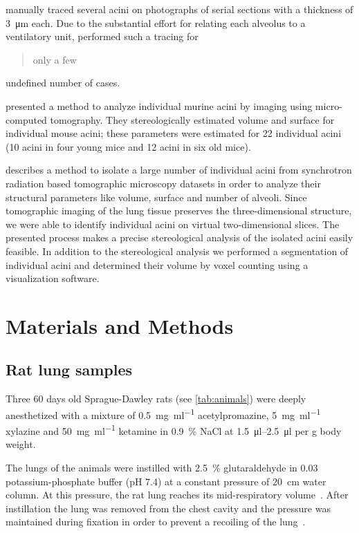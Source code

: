 \documentclass[final,paper=a4,DIV=calc,abstract,english]{scrartcl}
\begin{document}
\citet{Mercer1987a} manually traced several acini on photographs of serial sections with a thickness of \SI{3}{\micro\meter} each.
Due to the substantial effort for relating each alveolus to a ventilatory unit, \citeauthor{Mercer1987a} performed such a tracing for \blockquote{only a few} undefined number of cases.

\citet{Vasilescu2012} presented a method to analyze individual murine acini by imaging using micro-computed tomography.
They stereologically estimated volume and surface for individual mouse acini; these parameters were estimated for 22 individual acini (10 acini in four young mice and 12 acini in six old mice).

 describes a method to isolate a large number of individual acini from synchrotron radiation based tomographic microscopy datasets in order to analyze their structural parameters like volume, surface and number of alveoli.
Since tomographic imaging of the lung tissue preserves the three-dimensional structure, we were able to identify individual acini on virtual two-dimensional slices.
The presented process makes a precise stereological analysis of the isolated acini easily feasible.
In addition to the stereological analysis we performed a segmentation of individual acini and determined their volume by voxel counting using a visualization software.

\section{Materials and Methods}
\label{sec:materials and methods}
\subsection{Rat lung samples}
Three 60 days old Sprague-Dawley rats (see \autoref{tab:animals}) were deeply anesthetized with a mixture of %
\SI[per-mode=fraction]{0.5}{\milli\gram\per\milli\litre} acetylpromazine, %
\SI[per-mode=fraction]{5}{\milli\gram\per\milli\litre} xylazine and %
\SI[per-mode=fraction]{50}{\milli\gram\per\milli\litre} ketamine in %
\SI{0.9}{\percent} NaCl at \SIrange{1.5}{2.5}{\micro\litre} per \si{\gram} body weight.

The lungs of the animals were instilled with \SI{2.5}{\percent} glutaraldehyde in \SI{0.03}{\milli\Molar} potassium-phosphate buffer (pH 7.4) at a constant pressure of \SI{20}{\centi\meter} water column.
At this pressure, the rat lung reaches its mid-respiratory volume~.
After instillation the lung was removed from the chest cavity and the pressure was maintained during fixation in order to prevent a recoiling of the lung~.
\end{document}
